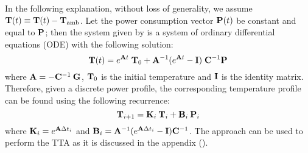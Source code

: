 In the following explanation, without loss of generality, we assume $\mathbf{T}(t)
\equiv \mathbf{T}(t) - \mathbf{T}_{\mathrm{amb}}$. Let the power consumption vector $\mathbf{P}(t)$
be constant and equal to $\mathbf{P}$; then the system given by 
is a system of ordinary differential equations (ODE) with the following
solution:
\begin{equation} \elab{solution}
  \v{T}(t) = e^{\m{A} t} \; \v{T}_0 + \m{A}^{-1} (e^{\m{A} t} - \m{I}) \; \m{C}^{-1} \v{P}
\end{equation}
where $\mathbf{A} = -\mathbf{C}^{-1} \: \mathbf{G}$, $\mathbf{T}_0$ is the initial temperature and
$\mathbf{I}$ is the identity matrix. Therefore, given a discrete power profile, the
corresponding temperature profile can be found using the following recurrence:
\begin{equation} \elab{recurrent-system}
  \v{T}_{i+1} = \m{K}_i \: \v{T}_i + \m{B}_i \: \v{P}_i
\end{equation}
where $\mathbf{K}_i = e^{\mathbf{A} \Delta t_i}$ and $\mathbf{B}_i = \mathbf{A}^{-1}(e^{\mathbf{A} \Delta
t_i} - \mathbf{I})\mathbf{C}^{-1}$. The approach can be used to perform the TTA as it is
discussed in the appendix ().

